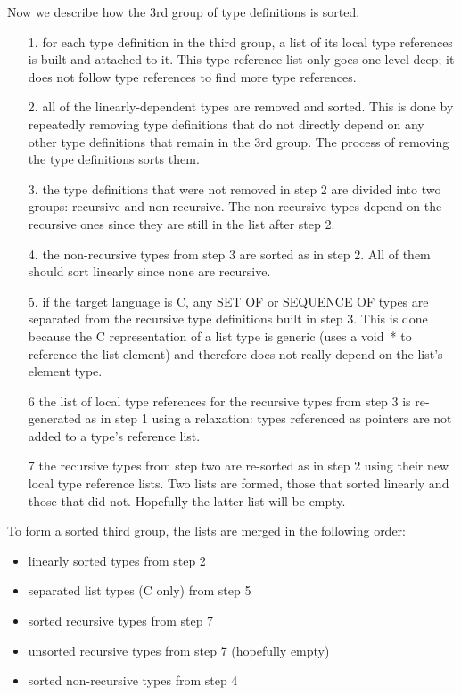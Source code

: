 Now we describe how the 3rd group of type definitions is sorted.
\begin{itemize}

\item[1.] {for each type definition in the third group, a list of its local type
references is built and attached to it.  This type reference list only
goes one level deep; it does not follow type references to find more
type references.}

\item[2.] { all of the linearly-dependent types are removed and sorted.
This is done by repeatedly removing type definitions that do not
directly depend on any other type definitions that remain in the 3rd
group.  The process of removing the type definitions sorts them.}

\item[3.] { the type definitions that were not removed in step 2 are
divided into two groups: recursive and non-recursive.  The
non-recursive types depend on the recursive ones since they are still
in the list after step 2.}

\item[4.] { the non-recursive types from step 3 are sorted as in step
2.  All of them should sort linearly since none are recursive. }

\item[5.] { if the target language is C, any SET OF or SEQUENCE OF
types are separated from the recursive type definitions built in step 3.
This is done because the C representation of a list type is generic
(uses a {\C void~*} to reference the list element) and therefore does
not really depend on the list's element type.}

\item[6] { the list of local type references for the recursive types
from step 3 is re-generated as in step 1 using a relaxation:  types
referenced as pointers are not added to a type's reference list.}

\item[7] { the recursive types from step two are re-sorted as in step
2 using their new local type reference lists. Two lists are formed,
those that sorted linearly and those that did not. Hopefully the
latter list will be empty.}
\end{itemize}

To form a sorted third group, the lists are merged in the following order:
\begin{itemize}
\item {linearly sorted types from step 2}
\item {separated list types (C only) from step 5}
\item {sorted recursive types from step 7}
\item {unsorted recursive types from step 7 (hopefully empty)}
\item {sorted non-recursive types from step 4}
\end{itemize}


